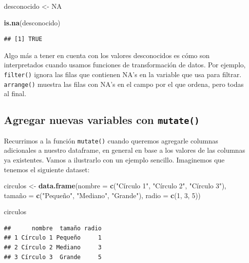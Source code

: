 \documentclass[]{book}
\newenvironment{Shaded}{\begin{snugshade}}{\end{snugshade}}
\newcommand{\KeywordTok}[1]{\textcolor[rgb]{0.13,0.29,0.53}{\textbf{#1}}}
\newcommand{\DataTypeTok}[1]{\textcolor[rgb]{0.13,0.29,0.53}{#1}}
\newcommand{\DecValTok}[1]{\textcolor[rgb]{0.00,0.00,0.81}{#1}}
\newcommand{\StringTok}[1]{\textcolor[rgb]{0.31,0.60,0.02}{#1}}
\newcommand{\OtherTok}[1]{\textcolor[rgb]{0.56,0.35,0.01}{#1}}
\newcommand{\NormalTok}[1]{#1}
\begin{document}
\begin{Shaded}
\begin{Highlighting}[]
\NormalTok{desconocido <-}\StringTok{ }\OtherTok{NA}

\KeywordTok{is.na}\NormalTok{(desconocido)}
\end{Highlighting}
\end{Shaded}

\begin{verbatim}
## [1] TRUE
\end{verbatim}

Algo más a tener en cuenta con los valores desconocidos es cómo son
interpretados cuando usamos funciones de transformación de datos. Por
ejemplo, \texttt{filter()} ignora las filas que contienen NA's en la
variable que usa para filtrar. \texttt{arrange()} muestra las filas con
NA's en el campo por el que ordena, pero todas al final.

\subsection{\texorpdfstring{Agregar nuevas variables con
\texttt{mutate()}}{Agregar nuevas variables con mutate()}}\label{agregar-nuevas-variables-con-mutate}

Recurrimos a la función \texttt{mutate()} cuando queremos agregarle
columnas adicionales a nuestro dataframe, en general en base a los
valores de las columnas ya existentes. Vamos a ilustrarlo con un ejemplo
sencillo. Imaginemos que tenemos el siguiente dataset:

\begin{Shaded}
\begin{Highlighting}[]
\NormalTok{circulos <-}\StringTok{ }\KeywordTok{data.frame}\NormalTok{(}\DataTypeTok{nombre =} \KeywordTok{c}\NormalTok{(}\StringTok{"Círculo 1"}\NormalTok{, }\StringTok{"Círculo 2"}\NormalTok{, }\StringTok{"Círculo 3"}\NormalTok{),}
\NormalTok{                       tamañ}\DataTypeTok{o =} \KeywordTok{c}\NormalTok{(}\StringTok{"Pequeño"}\NormalTok{, }\StringTok{"Mediano"}\NormalTok{, }\StringTok{"Grande"}\NormalTok{),}
                       \DataTypeTok{radio  =} \KeywordTok{c}\NormalTok{(}\DecValTok{1}\NormalTok{, }\DecValTok{3}\NormalTok{, }\DecValTok{5}\NormalTok{))}

\NormalTok{circulos}
\end{Highlighting}
\end{Shaded}

\begin{verbatim}
##      nombre  tamaño radio
## 1 Círculo 1 Pequeño     1
## 2 Círculo 2 Mediano     3
## 3 Círculo 3  Grande     5
\end{verbatim}
\end{document}
